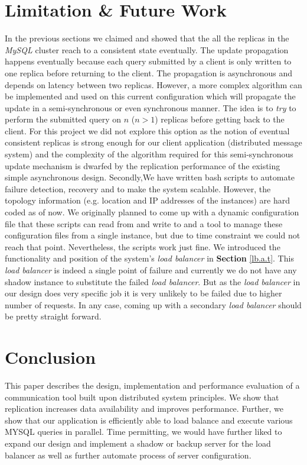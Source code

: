 \documentclass[12pt]{article}
\begin{document}
\section{Limitation \& Future Work}

In the previous sections we claimed and showed that the all the replicas in the
\emph{MySQL} cluster reach to a consistent state eventually. The update
propagation happens eventually because each query submitted by a client is only
written to one replica before returning to the client. The propagation is
asynchronous and depends on latency between two replicas. However, a more
complex algorithm can be implemented and used on this current configuration
which will propagate the update in a semi-synchronous or even synchronous
manner. The idea is to \emph{try} to perform the submitted query on $n$ ($n >
1$) replicas before getting back to the client. For this project we did not
explore this option as the notion of eventual consistent replicas is strong
enough for our client application (distributed message system) and the
complexity of the algorithm required for this semi-synchronous update mechanism
is dwarfed by the replication performance of the existing simple asynchronous
design. Secondly,We have written bash scripts to automate failure detection,
recovery and to make the system scalable. However, the topology information
(e.g. location and IP addresses of the instances) are hard coded as of now. We
originally planned to come up with a dynamic configuration file that these
scripts can read from and write to and a tool to manage these configuration
files from a single instance, but due to time constraint we could not reach that
point. Nevertheless, the scripts work just fine. We introduced the functionality
and position of the system\rq{}s \emph{load balancer} in \textbf{Section }
\ref{lb.a.t}. This \emph{load balancer} is indeed a single point of failure and
currently we do not have any shadow instance to substitute the failed \emph{load
balancer}. But as the \emph{load balancer} in our design does very specific job
it is very unlikely to be failed due to higher number of requests. In any case,
coming up with a secondary \emph{load balancer} should be pretty straight
forward. 

\section{Conclusion}
This paper describes the design, implementation and performance evaluation of a
communication tool built upon distributed system principles. We show that
replication increases data availability and improves performance. Further, we
show that our application is efficiently able to load balance and execute
various MYSQL queries in parallel. Time permitting, we would have further liked
to expand our design and implement a shadow or backup server for the load
balancer as well as further automate process of server configuration.
\end{document}
